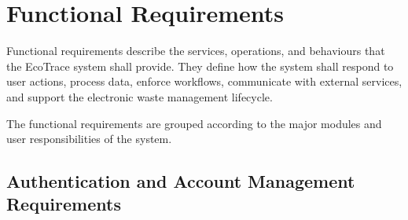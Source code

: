 \section{Functional Requirements}
\label{sec:functional-requirements}

Functional requirements describe the services, operations, and behaviours that
the EcoTrace system shall provide. They define how the system shall respond to
user actions, process data, enforce workflows, communicate with external
services, and support the electronic waste management lifecycle.

The functional requirements are grouped according to the major modules and
user responsibilities of the system.

\subsection{Authentication and Account Management Requirements}
